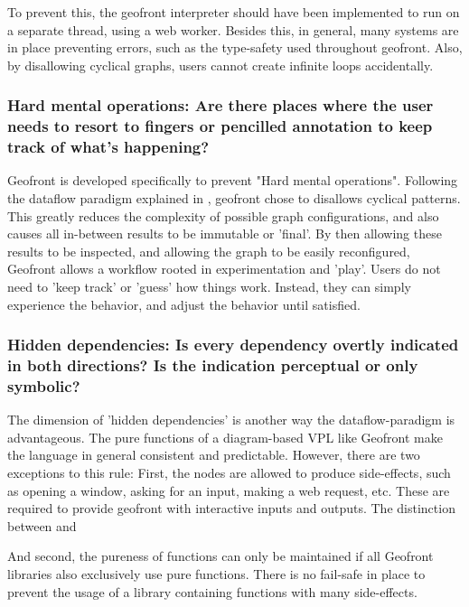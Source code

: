 To prevent this, the geofront interpreter should have been implemented to run on a separate thread, using a web worker. 
Besides this, in general, many systems are in place preventing errors, such as the type-safety used throughout geofront.
Also, by disallowing cyclical graphs, users cannot create infinite loops accidentally.

\subsubsection*{Hard mental operations: Are there places where the user needs to resort to fingers or pencilled annotation to keep track of what's happening?}

Geofront is developed specifically to prevent "Hard mental operations".
Following the dataflow paradigm explained in , geofront chose to disallows cyclical patterns. 
This greatly reduces the complexity of possible graph configurations, and also causes all in-between results to be immutable or 'final'.
By then allowing these results to be inspected, and allowing the graph to be easily reconfigured, Geofront allows a workflow rooted in experimentation and 'play'.
Users do not need to 'keep track' or 'guess' how things work.
Instead, they can simply experience the behavior, and adjust the behavior until satisfied. 



\subsubsection*{Hidden dependencies: Is every dependency overtly indicated in both directions? Is the indication perceptual or only symbolic?}

The dimension of 'hidden dependencies' is another way the dataflow-paradigm is advantageous. 
The pure functions of a diagram-based VPL like Geofront make the language in general consistent and predictable.
However, there are two exceptions to this rule:
First, the  nodes are allowed to produce side-effects, such as opening a window, asking for an input, making a web request, etc. 
These are required to provide geofront with interactive inputs and outputs.
The distinction between  and \m{}

And second, the pureness of functions can only be maintained if all Geofront libraries also exclusively use pure functions. 
There is no fail-safe in place to prevent the usage of a library containing functions with many side-effects. 

